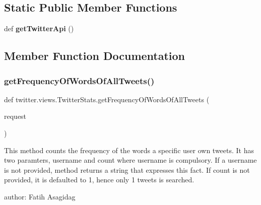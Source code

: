 \subsection*{Static Public Member Functions}
\begin{DoxyCompactItemize}
\item 
\mbox{\label{classtwitter_1_1views_1_1_twitter_stats_aa259d1356864ab08580a065ea7228ab6}} 
def {\bfseries get\+Twitter\+Api} ()
\end{DoxyCompactItemize}


\subsection{Member Function Documentation}
\mbox{\label{classtwitter_1_1views_1_1_twitter_stats_a48eab8e241bb382791c9f2803b57ca34}} 
\subsubsection{\texorpdfstring{get\+Frequency\+Of\+Words\+Of\+All\+Tweets()}{getFrequencyOfWordsOfAllTweets()}}
{\footnotesize\ttfamily def twitter.\+views.\+Twitter\+Stats.\+get\+Frequency\+Of\+Words\+Of\+All\+Tweets (\begin{DoxyParamCaption}\item[{}]{request }\end{DoxyParamCaption})}

\begin{DoxyVerb}This method counts the frequency of the words a specific user own tweets.
It has two paramters, username and count where username is compulsory.
If a username is not provided, method returns a string that expresses this fact.
If count is not provided, it is defaulted to 1, hence only 1 tweets is searched.

author: Fatih Asagidag
\end{DoxyVerb}
 \mbox{\label{classtwitter_1_1views_1_1_twitter_stats_a880c4da522b5f91c401c54861dc3ad12}} 
